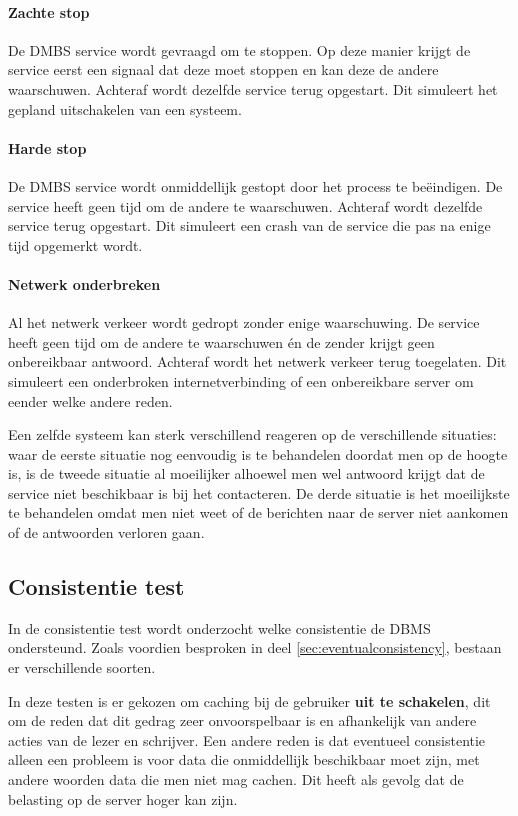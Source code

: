 \paragraph{Zachte stop} De DMBS service wordt gevraagd om te stoppen. Op deze manier krijgt de service eerst een signaal dat deze moet stoppen en kan deze de andere waarschuwen. Achteraf wordt dezelfde service terug opgestart. Dit simuleert het gepland uitschakelen van een systeem. 

\paragraph{Harde stop} De DMBS service wordt onmiddellijk gestopt door het process te beëindigen. De service heeft geen tijd om de andere te waarschuwen. Achteraf wordt dezelfde service terug opgestart. Dit simuleert een crash van de service die pas na enige tijd opgemerkt wordt. 

\paragraph{Netwerk onderbreken} Al het netwerk verkeer wordt gedropt zonder enige waarschuwing. De service heeft geen tijd om de andere te waarschuwen én de zender krijgt geen onbereikbaar antwoord. Achteraf wordt het netwerk verkeer terug toegelaten. Dit simuleert een onderbroken internetverbinding of een onbereikbare server om eender welke andere reden.  

Een zelfde systeem kan sterk verschillend reageren op de verschillende situaties: waar de eerste situatie nog eenvoudig is te behandelen doordat men op de hoogte is, is de tweede situatie al moeilijker alhoewel men wel antwoord krijgt dat de service niet beschikbaar is bij het contacteren. De derde situatie is het moeilijkste te behandelen omdat men niet weet of de berichten naar de server niet aankomen of de antwoorden verloren gaan. 
 
\subsection{Consistentie test}
In de consistentie test wordt onderzocht welke consistentie de DBMS ondersteund. Zoals voordien besproken in deel \ref{sec:eventualconsistency}, bestaan er verschillende soorten. 

In deze testen is er gekozen om caching bij de gebruiker \textbf{uit te schakelen}, dit om de reden dat dit gedrag zeer onvoorspelbaar is en afhankelijk van andere acties van de lezer en schrijver. Een andere reden is dat eventueel consistentie alleen een probleem is voor data die onmiddellijk beschikbaar moet zijn, met andere woorden data die men niet mag cachen. Dit heeft als gevolg dat de belasting op de server hoger kan zijn. 

